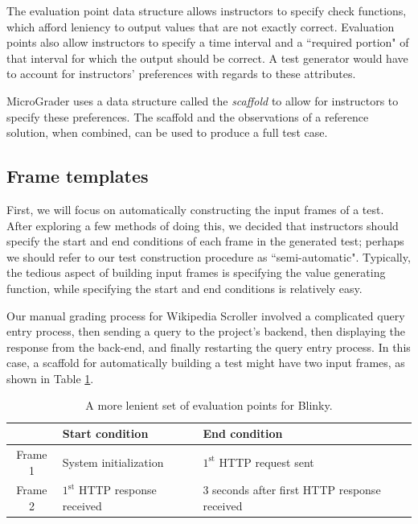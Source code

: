 \documentclass[12pt]{article}
\begin{document}
The evaluation point data structure allows instructors to specify check functions, which afford leniency to output values that are not exactly correct.  Evaluation points also allow instructors to specify a time interval and a ``required portion" of that interval for which the output should be correct.  A test generator would have to account for instructors' preferences with regards to these attributes.

MicroGrader uses a data structure called the \textit{scaffold} to allow for instructors to specify these preferences.  The scaffold and the observations of a reference solution, when combined, can be used to produce a full test case.

\subsection{Frame templates}
First, we will focus on automatically constructing the input frames of a test.  After exploring a few methods of doing this, we decided that instructors should specify the start and end conditions of each frame in the generated test; perhaps we should refer to our test construction procedure as ``semi-automatic".  Typically, the tedious aspect of building input frames is specifying the value generating function, while specifying the start and end conditions is relatively easy.

Our manual grading process for Wikipedia Scroller involved a complicated query entry process, then sending a query to the project's backend, then displaying the response from the back-end, and finally restarting the query entry process.  In this case, a scaffold for automatically building a test might have two input frames, as shown in Table \ref{table:frame-templates}.

\begin{table}[ht]
\begin{center}
\vspace{2mm}
\begin{tabular}{c|ll}
& Start condition & End condition \\ \hline
Frame 1 & System initialization & $1^{\text{st}}$ HTTP request sent \\
Frame 2 & $1^{\text{st}}$ HTTP response received & 3 seconds after first HTTP response received \\ \hline
\end{tabular}
\caption{A more lenient set of evaluation points for Blinky.}
\label{table:frame-templates}
\end{center}
\end{table}
\end{document}
